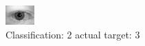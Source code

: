 \begin{figure}[h!]
\begin{center}
\includegraphics[width=0.60\columnwidth]{figures/ID673_class_2_target_3.png}
\end{center}
\caption{ Classification: 2 actual target: 3}
\label{fig:ID673_class_2_target_3}
\end{figure}
